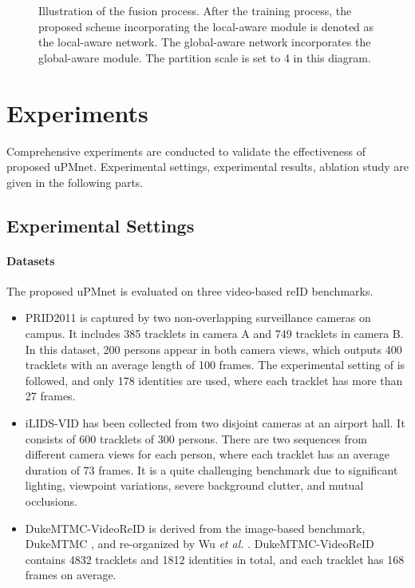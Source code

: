 \documentclass{cta-author}
\begin{document}
	\begin{figure}[!h]
		\caption{Illustration of the fusion process. After the training process, the proposed scheme incorporating the local-aware module is denoted as the local-aware network. The global-aware network incorporates the global-aware module. The partition scale  is set to 4 in this diagram.  \label{framework-for-test}} 
	\end{figure}
	
	
	\section{Experiments} \label{Experiments}
	Comprehensive experiments are conducted to validate the effectiveness of proposed uPMnet. Experimental settings, experimental results, ablation study are given in the following parts.
	
	\subsection{Experimental Settings}
	\paragraph{Datasets}
	The proposed uPMnet is evaluated on three video-based reID benchmarks.
	\begin{itemize}
		\item PRID2011 \cite{RN386} is captured by two non-overlapping surveillance cameras on campus. It includes 385 tracklets in camera A and 749 tracklets in camera B. In this dataset, 200 persons appear in both camera views, which outputs 400 tracklets with an average length of 100 frames. The experimental setting of \cite{RN386} \cite{RN87} \cite{RN109} \cite{RN102} is followed, and only 178 identities are used, where each tracklet has more than 27 frames.
		\item iLIDS-VID \cite{RN385} has been collected from two disjoint cameras at an airport hall. It consists of 600 tracklets of 300 persons. There are two sequences from different camera views for each person, where each tracklet has an average duration of 73 frames. It is a quite challenging benchmark due to significant lighting, viewpoint variations, severe background clutter, and mutual occlusions.
		\item DukeMTMC-VideoReID is derived from the image-based benchmark, DukeMTMC \cite{RN170}, and re-organized by Wu \textit{et al.} \cite{RN391}. DukeMTMC-VideoReID contains 4832 tracklets and 1812 identities in total, and each tracklet has 168 frames on average.
	\end{itemize}
\end{document}
